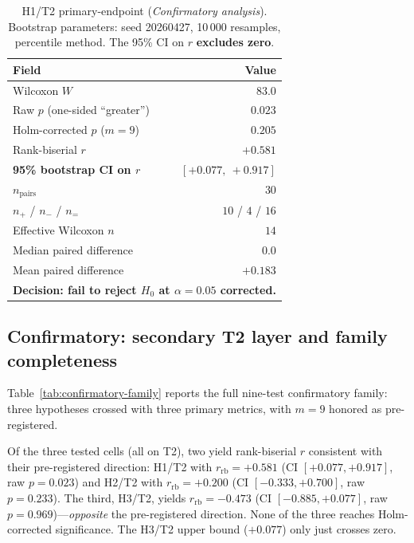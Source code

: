 \documentclass[11pt]{article}
\begin{document}
\begin{table}[h]
\centering
\small
\caption{H1/T2 primary-endpoint (\emph{Confirmatory analysis}).
Bootstrap parameters: seed 20260427, 10\,000 resamples, percentile method.
The 95\% CI on $r$ \textbf{excludes zero}.}
\label{tab:h1-t2-primary}
\begin{tabular}{lr}
\toprule
Field & Value \\
\midrule
Wilcoxon $W$                          & $83.0$ \\
Raw $p$ (one-sided ``greater'')       & $0.023$ \\
Holm-corrected $p$ ($m = 9$)          & $0.205$ \\
Rank-biserial $r$                     & $+0.581$ \\
\textbf{95\% bootstrap CI on $r$}     & $\mathbf{[+0.077,\ +0.917]}$ \\
$n_{\text{pairs}}$                    & $30$ \\
$n_{+}$ / $n_{-}$ / $n_{=}$           & $10$ / $4$ / $16$ \\
Effective Wilcoxon $n$                & $14$ \\
Median paired difference              & $0.0$ \\
Mean paired difference                & $+0.183$ \\
\midrule
\multicolumn{2}{l}{\textbf{Decision: fail to reject $H_0$ at $\alpha=0.05$ corrected.}} \\
\bottomrule
\end{tabular}
\end{table}

\subsection{Confirmatory: secondary T2 layer and family completeness}
\label{sec:4.2}
Table~\ref{tab:confirmatory-family} reports the full nine-test
confirmatory family: three hypotheses crossed with three primary
metrics, with $m = 9$ honored as pre-registered.

Of the three tested cells (all on T2), two yield rank-biserial $r$
consistent with their pre-registered direction: H1/T2 with
$r_{\text{rb}} = +0.581$ (CI $[+0.077, +0.917]$, raw $p = 0.023$)
and H2/T2 with $r_{\text{rb}} = +0.200$ (CI $[-0.333, +0.700]$, raw
$p = 0.233$). The third, H3/T2, yields $r_{\text{rb}} = -0.473$
(CI $[-0.885, +0.077]$, raw $p = 0.969$)---\emph{opposite} the
pre-registered direction. None of the three reaches Holm-corrected
significance. The H3/T2 upper bound ($+0.077$) only just crosses zero.
\end{document}
